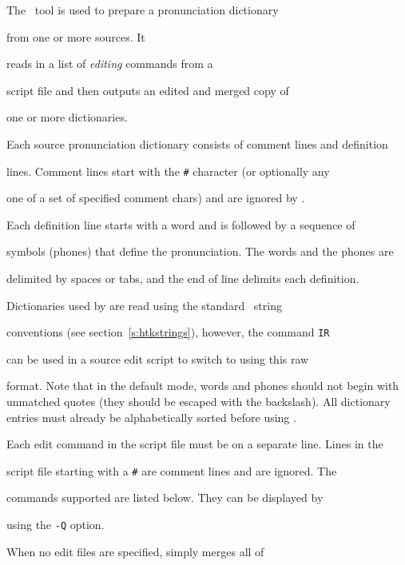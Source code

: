 The \HTK\ tool  is used to prepare a pronunciation dictionary 


from one or more sources.  It


reads in a list of \textit{editing} commands from a


script file and then outputs an edited and merged copy of 


one or more dictionaries.





Each source pronunciation dictionary consists of comment lines and definition


lines.  Comment lines start with the \texttt{\#} character (or optionally any


one of a set of specified comment chars) and are ignored by .


Each definition line starts with a word and is followed by a sequence of


symbols (phones) that define the pronunciation.  The words and the phones are


delimited by spaces or tabs, and the end of line delimits each definition.





Dictionaries used by  are read using the standard \HTK\ string


conventions (see section~\ref{s:htkstrings}), however, the command \texttt{IR}


can be used in a  source edit script to switch to using this raw


format. Note that in the default mode, words and phones should not begin with unmatched quotes (they should be escaped with the backslash). All dictionary entries must already be alphabetically sorted before using .





Each edit command in the script file must be on a separate line.  Lines in the


script file starting with a \texttt{\#} are comment lines and are ignored.  The


commands supported are listed below.  They can be displayed by 


using the \texttt{-Q} option.





When no edit files are specified,  simply merges all of


